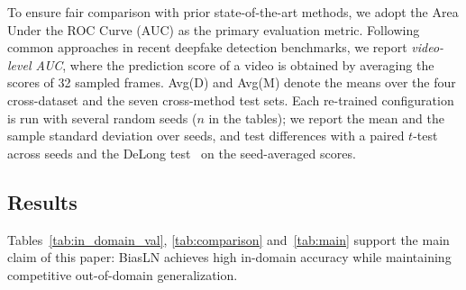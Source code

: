 \documentclass[fonts]{icst}
\newif\ifrevmark\revmarkfalse
\newcommand{\rev}[1]{\ifrevmark{\color{revblue}#1}\else#1\fi}
\begin{document}
To ensure fair comparison with prior state-of-the-art methods, we adopt the Area Under the ROC Curve (AUC) as the primary evaluation metric.
Following common \rev{approaches} in recent deepfake detection benchmarks, we report \textit{video-level AUC}, where the prediction score of a video is obtained by averaging the scores of 32 sampled frames.
\rev{Avg(D) and Avg(M) denote the means over the four cross-dataset and the seven cross-method test sets. Each re-trained configuration is run with several random seeds ($n$ in the tables); we report the mean and the sample standard deviation over seeds, and test differences with a paired $t$-test across seeds and the DeLong test~\cite{delong1988} on the seed-averaged scores.}

\subsection{Results}
\label{sec:main}

Tables~\ref{tab:in_domain_val}, \ref{tab:comparison} \rev{and~\ref{tab:main}} support the main claim of this paper: BiasLN achieves high in-domain accuracy while maintaining competitive out-of-domain generalization.

\begin{table}[H]
\centering
\caption{In-domain evaluation \rev{(video AUC, \%)} on the four manipulation subsets of \rev{the FF++ c23 test set. All models are re-trained under our protocol; values are seed means.}}
\label{tab:in_domain_val}
\label{tab:indomain}
\resizebox{\columnwidth}{!}{}
\end{table}

\begin{table}[t]
\centering
\captionsetup{labelsep=period, labelfont=bf, hypcap=false}
\caption{Benchmarking results of cross-dataset evaluations (Protocol-\rev{2}) and cross-method evaluations (Protocol-\rev{3}).
All detectors are trained on FF++ c23~\cite{rossler2019ff} and evaluated on other fake data.
\rev{The results of other methods are taken from Table~1 of Effort~\cite{yan2025effort} and, for ForAda and GenD, from their papers; $\dagger$ marks the authors' released checkpoints. These numbers come from different training recipes and checkpoint-selection rules (Sec.~\ref{sec:selection}) and are not directly comparable with our row, which is selected on FF++ validation only and averaged over $n$ seeds.} Bold: best; shaded: second best.}
\label{tab:comparison}
\label{tab:literature}
\vspace{2mm}
\resizebox{\textwidth}{!}{}
\end{table}
\end{document}
